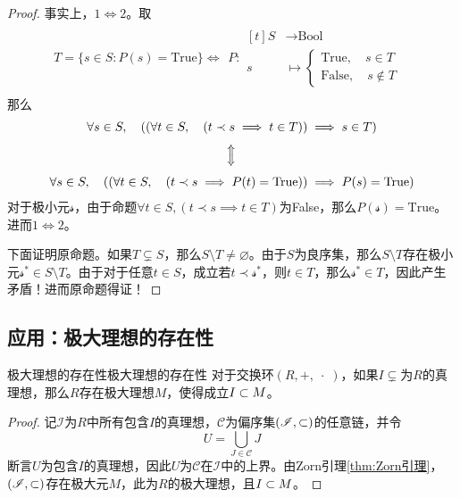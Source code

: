 \begin{proof}
	事实上，$1\iff 2$。取
	\begin{align*}
		T=\{ s\in S:P(s)=\text{True} \}\iff
		\begin{aligned}
			P:\begin{aligned}[t]
				S & \longrightarrow \text{Bool}\\
				s & \longmapsto \begin{cases}
					\text{True},\quad s\in T\\
					\text{False},\quad s\notin T
				\end{cases}
			\end{aligned}
		\end{aligned}
	\end{align*}
	那么
	\begin{gather*}
		\forall s\in S,\quad ((\forall t\in S,\quad (t\prec s\implies t\in T))\implies s\in T)\\
		\upiff\\
		\forall s\in S,\quad ((\forall t\in S,\quad (t\prec s\implies P(t)=\text{True}))\implies P(s)=\text{True})
	\end{gather*}
	对于极小元$\mathcal{s}$，由于命题$\forall t\in S,(t\prec s\implies t\in T)$为False，那么$P(\mathcal{s})=\text{True}$。进而$1\iff 2$。
	
	下面证明原命题。如果$T\subsetneq S$，那么$S\setminus T\ne\varnothing$。由于$S$为良序集，那么$S\setminus T$存在极小元$\mathcal{s}^*\in S\setminus T$。由于对于任意$t\in S$，成立若$t\prec \mathcal{s}^*$，则$t\in T$，那么$\mathcal{s}^*\in T$，因此产生矛盾！进而原命题得证！
\end{proof}

\subsection{应用：极大理想的存在性}

\begin{theorem}{极大理想的存在性}{极大理想的存在性}
	对于交换环$(R,+,\;\cdot \;)$，如果$I\subsetneq$为$R$的真理想，那么$R$存在极大理想$M$，使得成立$I\subset M$。
\end{theorem}

\begin{proof}
	记$\mathscr{I}$为$R$中所有包含$I$的真理想，$\mathscr{C}$为偏序集$(\mathscr{I},\subset)$的任意链，并令%
	$$
	U=\bigcup_{J\in \mathscr{C}}J
	$$
	断言$U$为包含$I$的真理想，因此$U$为$\mathscr{C}$在$\mathscr{I}$中的上界。由Zorn引理\ref{thm:Zorn引理}，$(\mathscr{I},\subset)$存在极大元$M$，此为$R$的极大理想，且$I\subset M$。
\end{proof}

